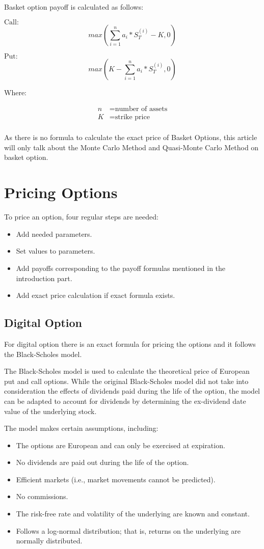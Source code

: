 \documentclass[]{elsarticle}
\theoremstyle{definition}
\theoremstyle{remark}
\begin{document}
Basket option payoff is calculated as follows:

$\text{Call}:$
$$max(\sum_{i=1}^n {a_i*S_T^{(i)}} - K, 0)$$

$\text{Put}:$
$$max(K - \sum_{i=1}^n {a_i*S_T^{(i)}}, 0)$$

Where:

\begin{align*}
n & = \text{number of assets}\\ 
K & = \text{strike price}\\
\end{align*}
 
 
As there is no formula to calculate the exact price of Basket Options, this article will only talk about the Monte Carlo Method and Quasi-Monte Carlo Method on basket option.

\section{Pricing Options}
To price an option, four regular steps are needed:
\begin{itemize}
\item Add needed parameters.
\item Set values to parameters.
\item Add payoffs corresponding to the payoff formulas mentioned in the introduction part.
\item Add exact price calculation if exact formula exists.
\end{itemize}

\subsection{Digital Option}
For digital option there is an exact formula for pricing the options and it follows the Black-Scholes model.

The Black-Scholes model is used to calculate the theoretical price of European put and call options. While the original Black-Scholes model did not take into consideration the effects of dividends paid during the life of the option, the model can be adapted to account for dividends by determining the ex-dividend date value of the underlying stock.

The model makes certain assumptions, including:
\begin{itemize}
\item The options are European and can only be exercised at expiration.
\item No dividends are paid out during the life of the option.
\item Efficient markets (i.e., market movements cannot be predicted).
\item No commissions.
\item The risk-free rate and volatility of the underlying are known and constant.
\item Follows a log-normal distribution; that is, returns on the underlying are normally distributed.
\end{itemize}
\end{document}
